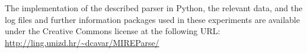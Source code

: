 \documentclass[11pt,a4paper,english]{article}
\begin{document}
The implementation of the described parser in Python, the relevant data, and the log files and further information packages used in these experiments are available under the Creative Commons license at the following URL:\\
\url{http://ling.unizd.hr/~dcavar/MIREParse/}




\end{document}
